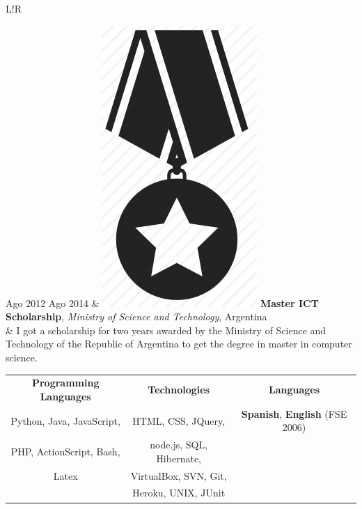 \documentclass[10pt]{article}
\newcommand\VRule{\color{lightgray}\vrule width 0.5pt}
\begin{document}
\begin{tabular}{L!{\VRule}R}

Ago 2012 Ago 2014 & \includegraphics[scale=0.022]{../img/medal.png}
\textbf{Master ICT Scholarship}, \textit{Ministry of Science and 
Technology}, Argentina\\
& \vspace{-0.7cm} I got a scholarship for two years awarded by the Ministry of 
Science and Technology of the Republic of Argentina to
get the degree in master in computer science.\\
\end{tabular}


\vspace{1em}
\begin{tabular}{ccc}
\textbf{Programming Languages} & \textbf{Technologies} & \textbf{Languages}\\
Python, Java, JavaScript, 
 & HTML, CSS, JQuery,
 & {\bf Spanish}, {\bf English} (FSE 2006) \\
  PHP, ActionScript, Bash, & node.js, SQL, Hibernate, & \\
Latex & VirtualBox, SVN, Git, & \\
 &  Heroku, UNIX, JUnit & \\
\end{tabular}
\end{document}
